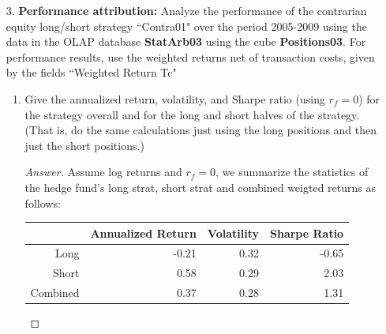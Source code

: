 \documentclass[10pt]{article}
\begin{document}
\begin{enumerate}
\begin{enumerate}
\begin{proof}[Answer]
        
        
        \end{proof}
        
        
        \item Based on your analysis in 2004, how do you expect the fund to perform for the five-year period ahead?
        \begin{proof}[Answer] Based on the Fama-French model, we see that the fund is netural to all Fama-French factors and has a significant alpha. Thus, we would expect the fund to perform very well in the upcoming five-year period.
        
        \end{proof}
    \end{enumerate}
  




    \item[3.] \textbf{Performance attribution:} Analyze the performance of the contrarian equity long/short strategy ``Contra01" over the period 2005-2009 using the data in the OLAP database \textbf{StatArb03} using the cube \textbf{Positions03}. For performance results, use the weighted returns net of transaction costs, given by the fields ``Weighted Return Tc"
    \begin{enumerate}
        \item  Give the annualized return, volatility, and Sharpe ratio (using $r_f=0$) for the strategy overall and for the long and short halves of the strategy. (That is, do the same calculations just using the long positions and then just the short positions.)
        \begin{proof}[Answer] Assume log returns and $r_f=0$, we summarize the statistics of the hedge fund's long strat, short strat and combined weigted returns as follows:
        \begin{table}[ht]
\centering
\begin{tabular}{rrrr}
  \hline
 & Annualized Return & Volatility & Sharpe Ratio \\ 
  \hline
Long & -0.21 & 0.32 & -0.65 \\ 
  Short & 0.58 & 0.29 & 2.03 \\ 
  Combined & 0.37 & 0.28 & 1.31 \\ 
   \hline
\end{tabular}
\end{table}
        
        
        
        \end{proof}
        

\end{enumerate}
\end{enumerate}
\end{document}
